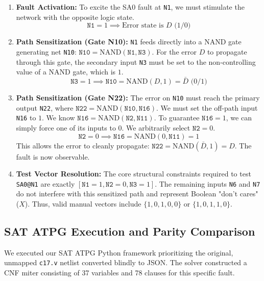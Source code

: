\documentclass[11pt,a4paper]{article}
\begin{document}
\begin{enumerate}
    \item \textbf{Fault Activation:} To excite the SA0 fault at \texttt{N1}, we must stimulate the network with the opposite logic state. 
    \begin{equation}
        \texttt{N1} = 1 \implies \text{Error state is } D \text{ (1/0)}
    \end{equation}
    
    \item \textbf{Path Sensitization (Gate N10):} \texttt{N1} feeds directly into a NAND gate generating net \texttt{N10}: $\texttt{N10} = \text{NAND}(\texttt{N1}, \texttt{N3})$. For the error $D$ to propagate through this gate, the secondary input \texttt{N3} must be set to the non-controlling value of a NAND gate, which is $1$.
    \begin{equation}
        \texttt{N3} = 1 \implies \texttt{N10} = \text{NAND}(D, 1) = \bar{D} \text{ (0/1)}
    \end{equation}

    \item \textbf{Path Sensitization (Gate N22):} The error on \texttt{N10} must reach the primary output \texttt{N22}, where $\texttt{N22} = \text{NAND}(\texttt{N10}, \texttt{N16})$. We must set the off-path input \texttt{N16} to $1$. 
    We know $\texttt{N16} = \text{NAND}(\texttt{N2}, \texttt{N11})$. To guarantee $\texttt{N16} = 1$, we can simply force one of its inputs to $0$. We arbitrarily select $\texttt{N2} = 0$.
    \begin{equation}
        \texttt{N2} = 0 \implies \texttt{N16} = \text{NAND}(0, \texttt{N11}) = 1
    \end{equation}
    This allows the error to cleanly propagate: $\texttt{N22} = \text{NAND}(\bar{D}, 1) = D$. The fault is now observable.

    \item \textbf{Test Vector Resolution:} The core structural constraints required to test \texttt{SA0@N1} are exactly $[\texttt{N1}=1, \texttt{N2}=0, \texttt{N3}=1]$. The remaining inputs \texttt{N6} and \texttt{N7} do not interfere with this sensitized path and represent Boolean "don't cares" ($X$). Thus, valid manual vectors include $\{1, 0, 1, 0, 0\}$ or $\{1, 0, 1, 1, 0\}$.
\end{enumerate}

\subsection{SAT ATPG Execution and Parity Comparison}
We executed our SAT ATPG Python framework prioritizing the original, unmapped \texttt{c17.v} netlist converted blindly to JSON. The solver constructed a CNF miter consisting of 37 variables and 78 clauses for this specific fault.
\end{document}
